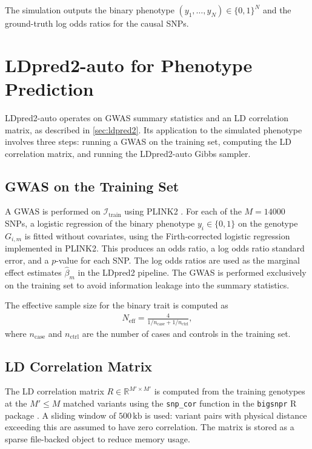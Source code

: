 The simulation outputs the binary phenotype $(y_1, \dots, y_N) \in \{0, 1\}^N$ and the ground-truth log odds ratios for the causal SNPs.

\section{LDpred2-auto for Phenotype Prediction}
\label{sec:app_ldpred2}

LDpred2-auto operates on GWAS summary statistics and an LD correlation matrix, as described in \autoref{sec:ldpred2}. Its application to the simulated phenotype involves three steps: running a GWAS on the training set, computing the LD correlation matrix, and running the LDpred2-auto Gibbs sampler.

\subsection{GWAS on the Training Set}

A GWAS is performed on $\mathcal{I}_{\text{train}}$ using PLINK2 \citep{Chang2015}. For each of the $M = 14000$ SNPs, a logistic regression of the binary phenotype $y_i \in \{0, 1\}$ on the genotype $G_{i,m}$ is fitted without covariates, using the Firth-corrected logistic regression implemented in PLINK2. This produces an odds ratio, a log odds ratio standard error, and a $p$-value for each SNP. The log odds ratios are used as the marginal effect estimates $\hat{\beta}_m$ in the LDpred2 pipeline. The GWAS is performed exclusively on the training set to avoid information leakage into the summary statistics.

The effective sample size for the binary trait is computed as
\begin{align*}
    N_{\text{eff}} = \frac{4}{1/n_{\text{case}} + 1/n_{\text{ctrl}}},
\end{align*}
where $n_{\text{case}}$ and $n_{\text{ctrl}}$ are the number of cases and controls in the training set.

\subsection{LD Correlation Matrix}

The LD correlation matrix $R \in \mathbb{R}^{M' \times M'}$ is computed from the training genotypes at the $M' \leq M$ matched variants using the \texttt{snp\_cor} function in the \texttt{bigsnpr} R package \citep{Prive2023}. A sliding window of $500\,\text{kb}$ is used: variant pairs with physical distance exceeding this are assumed to have zero correlation. The matrix is stored as a sparse file-backed object to reduce memory usage.

